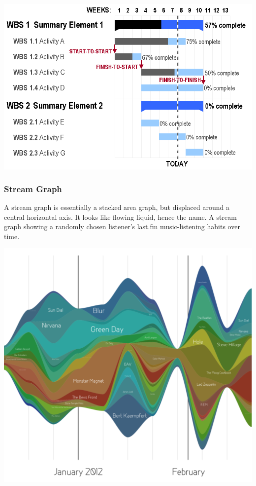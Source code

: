 \documentclass[]{book}
\begin{document}
\includegraphics{images/aya-gantt.png}

\hypertarget{stream-graph}{%
\subsubsection{Stream Graph}\label{stream-graph}}

A stream graph is essentially a stacked area graph, but displaced around a central horizontal axis. It looks like flowing liquid, hence the name. A stream graph showing a randomly chosen listener's last.fm music-listening habits over time.

\includegraphics{images/aya-stream.png}
\end{document}
